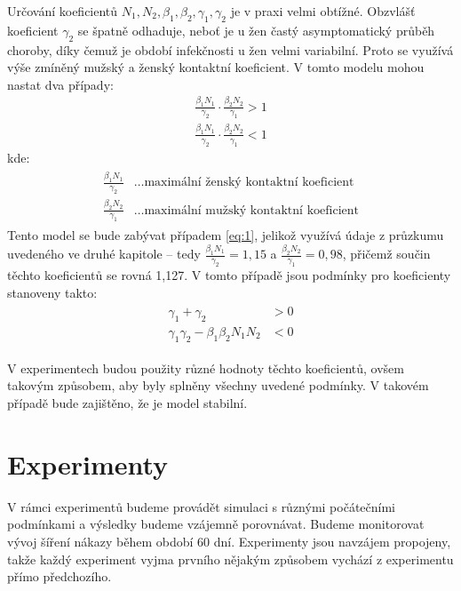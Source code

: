 \documentclass{article}
\begin{document}
Určování koeficientů $N_1, N_2, \beta_1, \beta_2, \gamma_1, \gamma_2$ je v praxi velmi obtížné. Obzvlášť koeficient $\gamma_2$ se špatně odhaduje, neboť je u žen častý asymptomatický průběh choroby, díky čemuž je období infekčnosti u žen velmi variabilní. Proto se využívá výše zmíněný mužský a ženský kontaktní koeficient. V tomto modelu mohou nastat dva případy:
{\large
\begin{align}
    \label{eq:1}
    \frac{\beta_1N_1}{\gamma_2}\cdot\frac{\beta_2N_2}{\gamma_1}>1\\
    \frac{\beta_1N_1}{\gamma_2}\cdot\frac{\beta_2N_2}{\gamma_1}<1
\end{align}
}%
kde:
\begin{align}
\begin{split}
    \frac{\beta_1N_1}{\gamma_2} &\dots \text{maximální ženský kontaktní koeficient}\\
    \frac{\beta_2N_2}{\gamma_1} &\dots \text{maximální mužský kontaktní koeficient}\nonumber
\end{split}
\end{align}
Tento model se bude zabývat případem \ref{eq:1}, jelikož využívá údaje z průzkumu uvedeného ve druhé kapitole -- tedy $\frac{\beta_1N_1}{\gamma_2}=1,15$ a $\frac{\beta_2N_2}{\gamma_1}=0,98$, přičemž součin těchto koeficientů se rovná 1,127. V tomto případě jsou podmínky pro koeficienty stanoveny takto:
{\large
\begin{align}
\begin{split}
    \gamma_1+\gamma_2&>0\\
    \gamma_1\gamma_2-\beta_1\beta_2N_1N_2&<0\nonumber
\end{split}
\end{align}
}%

V experimentech budou použity různé hodnoty těchto koeficientů, ovšem takovým způsobem, aby byly splněny všechny uvedené podmínky. V takovém případě bude zajištěno, že je model stabilní.
\newpage

\section{Experimenty}
V rámci experimentů budeme provádět simulaci s různými počátečními podmínkami a výsledky budeme vzájemně porovnávat. Budeme monitorovat vývoj šíření nákazy během období 60 dní. Experimenty jsou navzájem propojeny, takže každý experiment vyjma prvního nějakým způsobem vychází z experimentu přímo předchozího.
\end{document}
